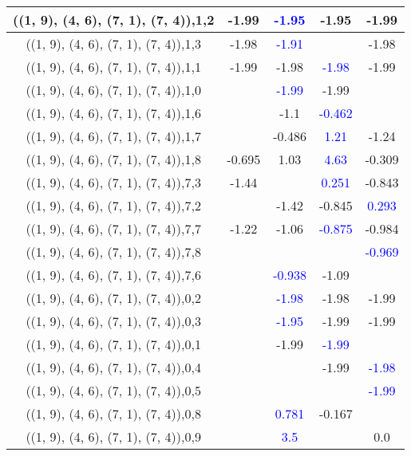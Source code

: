 \documentclass{article}
\begin{document}
\begin{center}
\begin{longtable}{|c|c|c|c|c|}
        	\hline
        	((1, 9), (4, 6), (7, 1), (7, 4)),1,2&-1.99& \textcolor{blue}{-1.95}&-1.95&-1.99\\
        	\hline
        	((1, 9), (4, 6), (7, 1), (7, 4)),1,3&-1.98& \textcolor{blue}{-1.91}&&-1.98\\
        	\hline
        	((1, 9), (4, 6), (7, 1), (7, 4)),1,1&-1.99&-1.98& \textcolor{blue}{-1.98}&-1.99\\
        	\hline
        	((1, 9), (4, 6), (7, 1), (7, 4)),1,0&& \textcolor{blue}{-1.99}&-1.99&\\
        	\hline
        	((1, 9), (4, 6), (7, 1), (7, 4)),1,6&&-1.1& \textcolor{blue}{-0.462}&\\
        	\hline
        	((1, 9), (4, 6), (7, 1), (7, 4)),1,7&&-0.486& \textcolor{blue}{1.21}&-1.24\\
        	\hline
        	((1, 9), (4, 6), (7, 1), (7, 4)),1,8&-0.695&1.03& \textcolor{blue}{4.63}&-0.309\\
        	\hline
        	((1, 9), (4, 6), (7, 1), (7, 4)),7,3&-1.44&& \textcolor{blue}{0.251}&-0.843\\
        	\hline
        	((1, 9), (4, 6), (7, 1), (7, 4)),7,2&&-1.42&-0.845& \textcolor{blue}{0.293}\\
        	\hline
        	((1, 9), (4, 6), (7, 1), (7, 4)),7,7&-1.22&-1.06& \textcolor{blue}{-0.875}&-0.984\\
        	\hline
        	((1, 9), (4, 6), (7, 1), (7, 4)),7,8&&&& \textcolor{blue}{-0.969}\\
        	\hline
        	((1, 9), (4, 6), (7, 1), (7, 4)),7,6&& \textcolor{blue}{-0.938}&-1.09&\\
        	\hline
        	((1, 9), (4, 6), (7, 1), (7, 4)),0,2&& \textcolor{blue}{-1.98}&-1.98&-1.99\\
        	\hline
        	((1, 9), (4, 6), (7, 1), (7, 4)),0,3&& \textcolor{blue}{-1.95}&-1.99&-1.99\\
        	\hline
        	((1, 9), (4, 6), (7, 1), (7, 4)),0,1&&-1.99& \textcolor{blue}{-1.99}&\\
        	\hline
        	((1, 9), (4, 6), (7, 1), (7, 4)),0,4&&&-1.99& \textcolor{blue}{-1.98}\\
        	\hline
        	((1, 9), (4, 6), (7, 1), (7, 4)),0,5&&&& \textcolor{blue}{-1.99}\\
        	\hline
        	((1, 9), (4, 6), (7, 1), (7, 4)),0,8&& \textcolor{blue}{0.781}&-0.167&\\
        	\hline
        	((1, 9), (4, 6), (7, 1), (7, 4)),0,9&& \textcolor{blue}{3.5}&&0.0\\

\end{longtable}
\end{center}
\end{document}
